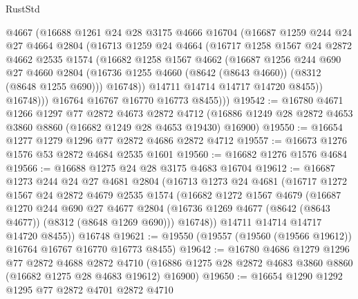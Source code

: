 \begin{lexlean}{RustStd}
\begin{coremodule}
            @4667
            (@16688
              @1261
              @24
              @28
              @3175
              @4666
              @16704
              (@16687
                @1259
                @244
                @24
                @27
                @4664
                @2804
                (@16713
                  @1259
                  @24
                  @4664
                  (@16717
                    @1258
                    @1567
                    @24
                    @2872
                    @4662
                    @2535
                    @1574
                    (@16682
                      @1258
                      @1567
                      @4662
                      (@16687
                        @1256
                        @244
                        @690
                        @27
                        @4660
                        @2804
                        (@16736 @1255 @4660 (@8642 (@8643 @4660)) (@8312 (@8648 @1255 @690)))
                        @16748))
                    @14711
                    @14714
                    @14717
                    @14720
                    @8455))
                @16748)))
          @16764
          @16767
          @16770
          @16773
          @8455)))
@19542 := @16780
    @4671
    @1266
    @1297
    @77
    @2872
    @4673
    @2872
    @4712
    (@16886 @1249 @28 @2872 @4653 @3860 @8860 (@16682 @1249 @28 @4653 @19430) @16900)
@19550 := @16654 @1277 @1279 @1296 @77 @2872 @4686 @2872 @4712
@19557 := @16673 @1276 @1576 @53 @2872 @4684 @2535 @1601
@19560 := @16682 @1276 @1576 @4684
@19566 := @16688 @1275 @24 @28 @3175 @4683 @16704
@19612 := @16687
    @1273
    @244
    @24
    @27
    @4681
    @2804
    (@16713
      @1273
      @24
      @4681
      (@16717
        @1272
        @1567
        @24
        @2872
        @4679
        @2535
        @1574
        (@16682
          @1272
          @1567
          @4679
          (@16687
            @1270
            @244
            @690
            @27
            @4677
            @2804
            (@16736 @1269 @4677 (@8642 (@8643 @4677)) (@8312 (@8648 @1269 @690)))
            @16748))
        @14711
        @14714
        @14717
        @14720
        @8455))
    @16748
@19621 := @19550 (@19557 (@19560 (@19566 @19612)) @16764 @16767 @16770 @16773 @8455)
@19642 := @16780
    @4686
    @1279
    @1296
    @77
    @2872
    @4688
    @2872
    @4710
    (@16886 @1275 @28 @2872 @4683 @3860 @8860 (@16682 @1275 @28 @4683 @19612) @16900)
@19650 := @16654 @1290 @1292 @1295 @77 @2872 @4701 @2872 @4710

\end{coremodule}
\end{lexlean}
